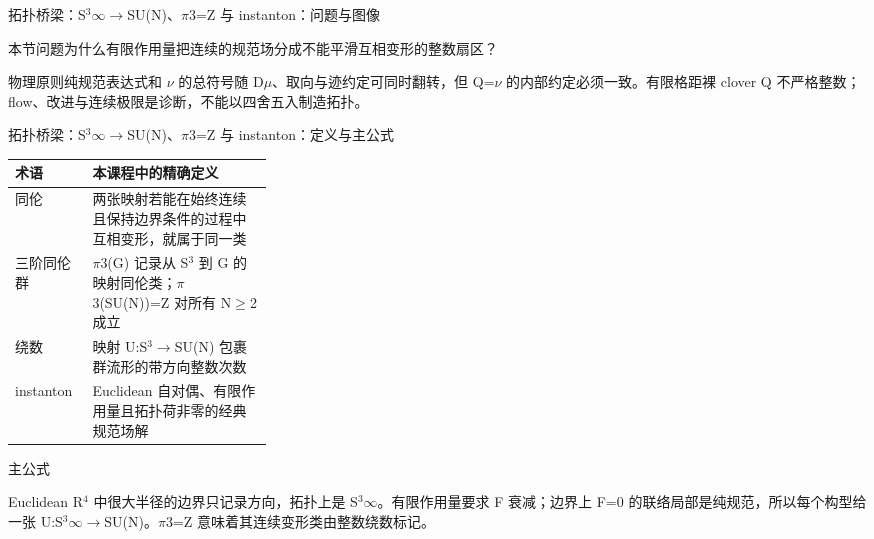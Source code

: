 \begin{frame}[t]{拓扑桥梁：S\ensuremath{^{3}}\ensuremath{\infty}\ensuremath{\rightarrow}SU(N)、\ensuremath{\pi}3=Z 与 instanton：问题与图像}
\footnotesize
\begin{block}{本节问题}为什么有限作用量把连续的规范场分成不能平滑互相变形的整数扇区？\end{block}
\begin{block}{物理原则}\quad 纯规范表达式和 \ensuremath{\nu} 的总符号随 D\ensuremath{\mu}、取向与迹约定可同时翻转，但 Q=\ensuremath{\nu} 的内部约定必须一致。有限格距裸 clover Q 不严格整数；flow、改进与连续极限是诊断，不能以四舍五入制造拓扑。\end{block}
\end{frame}

\begin{frame}[t]{拓扑桥梁：S\ensuremath{^{3}}\ensuremath{\infty}\ensuremath{\rightarrow}SU(N)、\ensuremath{\pi}3=Z 与 instanton：定义与主公式}
\footnotesize\begin{tabularx}{\linewidth}{p{0.30\linewidth}Y}
\toprule 术语 & 本课程中的精确定义\\\midrule
{} 同伦 & 两张映射若能在始终连续且保持边界条件的过程中互相变形，就属于同一类\\
 三阶同伦群 & \ensuremath{\pi}3(G) 记录从 S\ensuremath{^{3}} 到 G 的映射同伦类；\ensuremath{\pi}3(SU(N))=Z 对所有 N\ensuremath{\ge}2 成立\\
 绕数 & 映射 U:S\ensuremath{^{3}}\ensuremath{\rightarrow}SU(N) 包裹群流形的带方向整数次数\\
 instanton & Euclidean 自对偶、有限作用量且拓扑荷非零的经典规范场解\\
\bottomrule\end{tabularx}\vspace{0.15cm}
\begin{block}{ 主公式}\centering{}\end{block}
Euclidean R\ensuremath{^{4}} 中很大半径的边界只记录方向，拓扑上是 S\ensuremath{^{3}}\ensuremath{\infty}。有限作用量要求 F 衰减；边界上 F=0 的联络局部是纯规范，所以每个构型给一张 U:S\ensuremath{^{3}}\ensuremath{\infty}\ensuremath{\rightarrow}SU(N)。\ensuremath{\pi}3=Z 意味着其连续变形类由整数绕数标记。
\end{frame}

